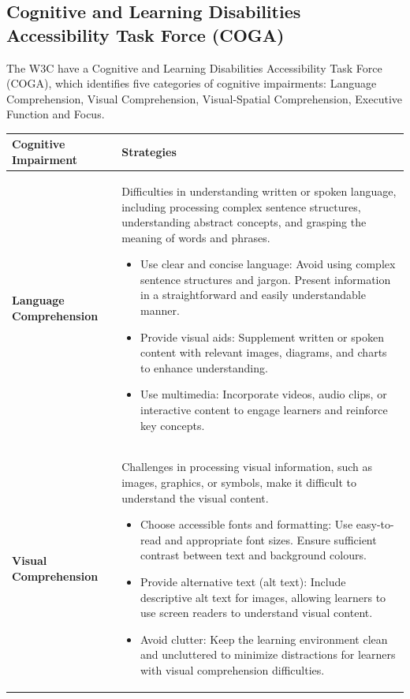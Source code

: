 \documentclass[main.tex]{subfiles}
\begin{document}
\subsection{Cognitive and Learning Disabilities Accessibility Task Force (COGA)}


The W3C have a Cognitive and Learning Disabilities Accessibility Task Force (COGA), which identifies five categories of cognitive impairments:  Language Comprehension, Visual Comprehension, Visual-Spatial Comprehension, Executive Function and Focus.


\begin{longtable}{p{4cm}p{10cm}}
    \toprule
    \textbf{Cognitive Impairment} & \textbf{Strategies} \\
    \midrule
    \endfirsthead
 
    \endhead
    \textbf{Language Comprehension} & Difficulties in understanding written or spoken language, including processing complex sentence structures, understanding abstract concepts, and grasping the meaning of words and phrases.
    \begin{itemize}
        \item Use clear and concise language: Avoid using complex sentence structures and jargon. Present information in a straightforward and easily understandable manner.
        \item Provide visual aids: Supplement written or spoken content with relevant images, diagrams, and charts to enhance understanding.
        \item Use multimedia: Incorporate videos, audio clips, or interactive content to engage learners and reinforce key concepts.
    \end{itemize} \\
    \midrule
    \textbf{Visual Comprehension} & Challenges in processing visual information, such as images, graphics, or symbols, make it difficult to understand the visual content.
    \begin{itemize}
        \item Choose accessible fonts and formatting: Use easy-to-read and appropriate font sizes. Ensure sufficient contrast between text and background colours.
        \item Provide alternative text (alt text): Include descriptive alt text for images, allowing learners to use screen readers to understand visual content.
        \item Avoid clutter: Keep the learning environment clean and uncluttered to minimize distractions for learners with visual comprehension difficulties.

\end{itemize}
\end{longtable}
\end{document}
